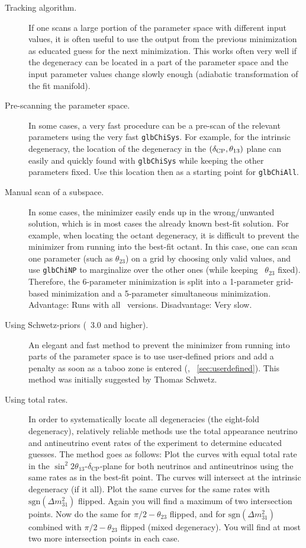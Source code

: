 \begin{description}
\item[Tracking algorithm.] If one scans a large portion of the parameter space with different input values, it is often useful to use the output from the previous minimization as educated guess for the next minimization. This works often very well if the degeneracy can be located in a part of the parameter space and the input parameter values change slowly enough (adiabatic transformation of the fit manifold). 
\item[Pre-scanning the parameter space.] In some cases, a very fast procedure can be a pre-scan 
of the relevant parameters using the very fast {\tt glbChiSys}. For example, for the intrinsic degeneracy, the location of the degeneracy in the $(\delta_{\mathrm{CP}},\theta_{13})$ plane can easily and quickly found with {\tt glbChiSys} while keeping the other parameters fixed. Use this location then as a starting point for {\tt glbChiAll}.
\item[Manual scan of a subspace.] In some cases, the minimizer easily ends up in the wrong/unwanted solution, which is in most cases the already known best-fit solution. For example, when locating the octant degeneracy, it is difficult to prevent the minimizer from running into the best-fit octant. In this case, one can scan one parameter (such as $\theta_{23}$) on a grid by choosing only valid values, and use {\tt glbChiNP} to marginalize over the other ones (while keeping \eg\ $\theta_{23}$ fixed). Therefore, the 6-parameter minimization is split into a 1-parameter grid-based minimization and a 5-parameter simultaneous minimization. Advantage: Runs with all \GLOBES\ versions. Disadvantage: Very slow. 
\item[Using Schwetz-priors (\GLOBES\ 3.0 and higher).] An elegant and fast method to prevent the minimizer from running into parts of the parameter space is to use user-defined priors and add a penalty as soon as a taboo zone is entered (\cf, \Sec~\ref{sec:userdefined}). This method was initially suggested by Thomas Schwetz.
\item[Using total rates.] In order to systematically locate all degeneracies (the eight-fold degeneracy), relatively reliable methods use the total appearance neutrino and antineutrino event rates of the experiment to determine educated guesses. The method goes as follows: Plot the curves with equal total rate in the $\sin^2 2 \theta_{13}$-$\delta_{\mathrm{CP}}$-plane for both neutrinos and antineutrinos using the same rates as in the best-fit point. The curves will intersect at the intrinsic degeneracy (if it all). Plot the same curves for the same rates with $\mathrm{sgn}(\Delta m_{31}^2)$ flipped. Again you will find a maximum of two intersection points. Now do the same for $\pi/2 - \theta_{23}$ flipped, and for  $\mathrm{sgn}(\Delta m_{31}^2)$ combined with $\pi/2 - \theta_{23}$ flipped (mixed degeneracy). You will find at most two more intersection points in each case.

\end{description}
